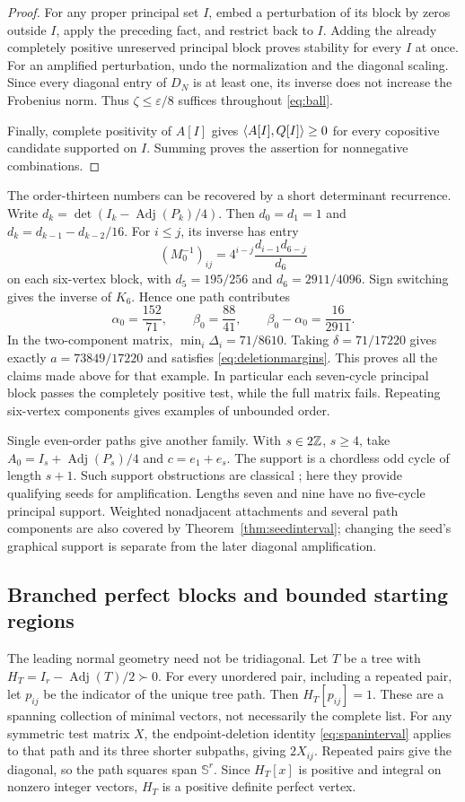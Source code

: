 \begin{proof}
For any proper principal set $I$, embed a perturbation of its block by zeros outside $I$, apply the preceding fact, and restrict back to $I$. Adding the already completely positive unreserved principal block proves stability for every $I$ at once. For an amplified perturbation, undo the normalization and the diagonal scaling. Since every diagonal entry of $D_N$ is at least one, its inverse does not increase the Frobenius norm. Thus $\zeta\le\varepsilon/8$ suffices throughout \eqref{eq:ball}.

Finally, complete positivity of $A[I]$ gives $\langle A[I],Q[I]\rangle\ge0$ for every copositive candidate supported on $I$. Summing proves the assertion for nonnegative combinations.
\end{proof}

The order-thirteen numbers can be recovered by a short determinant recurrence. Write $d_k=\det(I_k-\operatorname{Adj}(P_k)/4)$. Then $d_0=d_1=1$ and $d_k=d_{k-1}-d_{k-2}/16$. For $i\le j$, its inverse has entry
\[
 (M_0^{-1})_{ij}=4^{i-j}\frac{d_{i-1}d_{6-j}}{d_6}
\]
on each six-vertex block, with $d_5=195/256$ and $d_6=2911/4096$. Sign switching gives the inverse of $K_6$. Hence one path contributes
\[
 \alpha_0=\frac{152}{71},\qquad \beta_0=\frac{88}{41},\qquad
 \beta_0-\alpha_0=\frac{16}{2911}.
\]
In the two-component matrix, $\min_i\Delta_i=71/8610$. Taking
$\delta=71/17220$ gives exactly $a=73849/17220$ and satisfies \eqref{eq:deletionmargins}. This proves all the claims made above for that example. In particular each seven-cycle principal block passes the completely positive test, while the full matrix fails. Repeating six-vertex components gives examples of unbounded order.

Single even-order paths give another family. With $s\in2\mathbb Z$, $s\ge4$, take $A_0=I_s+\operatorname{Adj}(P_s)/4$ and $c=e_1+e_s$. The support is a chordless odd cycle of length $s+1$. Such support obstructions are classical \cite{Kogan}; here they provide qualifying seeds for amplification. Lengths seven and nine have no five-cycle principal support. Weighted nonadjacent attachments and several path components are also covered by Theorem~\ref{thm:seedinterval}; changing the seed's graphical support is separate from the later diagonal amplification.

\subsection{Branched perfect blocks and bounded starting regions}
The leading normal geometry need not be tridiagonal. Let $T$ be a tree with
$H_T=I_r-\operatorname{Adj}(T)/2\succ0$. For every unordered pair, including a repeated pair, let $p_{ij}$ be the indicator of the unique tree path. Then $H_T[p_{ij}]=1$. These are a spanning collection of minimal vectors, not necessarily the complete list. For any symmetric test matrix $X$, the endpoint-deletion identity \eqref{eq:spaninterval} applies to that path and its three shorter subpaths, giving $2X_{ij}$. Repeated pairs give the diagonal, so the path squares span $\mathbb S^r$. Since $H_T[x]$ is positive and integral on nonzero integer vectors, $H_T$ is a positive definite perfect vertex.

